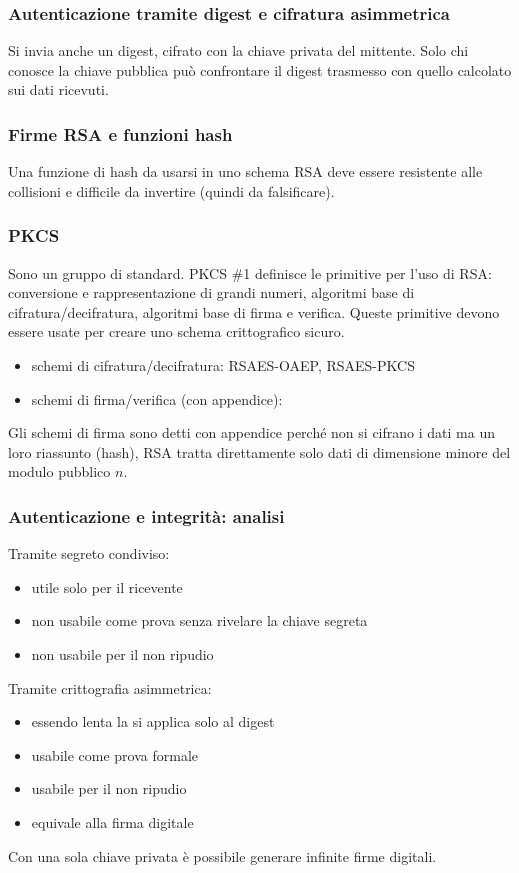 \documentclass[11pt]{article}
\begin{document}
\subsubsection{Autenticazione tramite digest e cifratura asimmetrica}
Si invia anche un digest, cifrato con la chiave privata del mittente. Solo chi conosce la chiave pubblica può confrontare 
il digest trasmesso con quello calcolato sui dati ricevuti.
\subsubsection{Firme RSA e funzioni hash}
Una funzione di hash da usarsi in uno schema RSA deve essere resistente alle collisioni e difficile da invertire (quindi 
da falsificare).
\subsubsection{PKCS}
Sono un gruppo di standard. PKCS \#1 definisce le primitive per l'uso di RSA: conversione e rappresentazione di grandi 
numeri, algoritmi base di cifratura/decifratura, algoritmi base di firma e verifica. Queste primitive devono essere usate 
per creare uno schema crittografico sicuro.
\begin{itemize}
    \item schemi di cifratura/decifratura: RSAES-OAEP, RSAES-PKCS 
    \item schemi di firma/verifica (con appendice):
\end{itemize}
Gli schemi di firma sono detti con appendice perché non si cifrano i dati ma un loro riassunto (hash), RSA tratta direttamente 
solo dati di dimensione minore del modulo pubblico $n$.
\subsubsection{Autenticazione e integrità: analisi}
Tramite segreto condiviso:
\begin{itemize}
    \item utile solo per il ricevente
    \item non usabile come prova senza rivelare la chiave segreta
    \item non usabile per il non ripudio
\end{itemize}
Tramite crittografia asimmetrica:
\begin{itemize}
    \item essendo lenta la si applica solo al digest 
    \item usabile come prova formale
    \item usabile per il non ripudio
    \item equivale alla firma digitale
\end{itemize}
Con una sola chiave privata è possibile generare infinite firme digitali.
\end{document}
